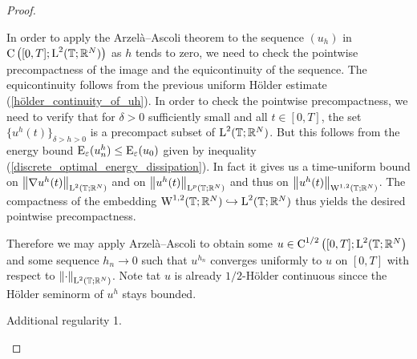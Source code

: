 \begin{proof}
\begin{description}[wide=0pt]
		In order to apply the Arzelà--Ascoli theorem to the sequence $ (u_{ h 
		} ) $ in $ \operatorname{C} \left( [ 0 , T ] ; \operatorname{L}^{ 2 } ( \operatorname{\mathbb{T}} ; \mathbb{ R 
		}^{ N } ) \right) $ as $ h $ tends to zero, we need to check the 
		pointwise precompactness of the image and the equicontinuity of the 
		sequence. 
		The equicontinuity follows from the previous uniform Hölder estimate 
		(\ref{hölder_continuity_of_uh}).
		In order to check the pointwise precompactness, we need to verify that 
		for $ \delta > 0 $ sufficiently small and all $ t \in [ 0 , T ] $, the 
		set
		$ \{ u^{ h } ( t ) \}_{ \delta > h > 0 } $ is a precompact subset of $ 
		\operatorname{L}^{ 2 } ( \operatorname{\mathbb{T}} ; \mathbb{ R }^{ N } ) $. 
		But this follows from the energy bound $ \operatorname{E}_{ \varepsilon } ( u_{ 
		n }^{ h } ) \leq \operatorname{E}_{ \varepsilon } ( u_{ 0 } ) $ given by 
		inequality (\ref{discrete_optimal_energy_dissipation}). In fact it 
		gives us a time-uniform bound on $ \norm{ \nabla u^{ h }( t ) }_{\operatorname{L}^{ 
		2 }( \operatorname{\mathbb{T}}; \mathbb{ R }^{ N } ) } $ and on $ \norm{ u^{ h } ( t 
		)}_{ \operatorname{L}^{ p } ( \operatorname{\mathbb{T}}; \mathbb{ R }^{ N } ) } $ and thus on $ 
		\norm{ u^{ h } ( t )}_{ \operatorname{W}^{ 1 , 2 } ( \operatorname{\mathbb{T}}; \mathbb{ R }^{ N } 
		) } $. 
		The compactness of the embedding
		$ \operatorname{W}^{ 1 , 2 } ( \operatorname{\mathbb{T}} ; \mathbb{ R }^{ N } ) \hookrightarrow \operatorname{L}^{ 2 } ( \operatorname{\mathbb{T}}; \mathbb{ R }^{ N } ) $ thus yields the desired pointwise precompactness.
		
		Therefore we may apply Arzelà--Ascoli to obtain some $ u \in \operatorname{C}^{ 1 
		/ 2 } \left( [ 0, T ] ; \operatorname{L}^{ 2 } ( \operatorname{\mathbb{T}} ; \mathbb{ R }^{ N } 
		\right) $ and some  sequence $ h_{ n } \to 0 $ such that
		$ u^{ h_{ n } } $ converges uniformly to $ u $ on $ [ 0 , T ] $ with 
		respect to $ \norm{ \cdot }_{ \operatorname{L}^{ 2 } ( \operatorname{\mathbb{T}} ; \mathbb{ R }^{ N 
		} ) } $.
		Note tat $ u $ is already $ 1/2 $-Hölder continuous sincce the Hölder 
		seminorm of $ u^{ h } $ stays bounded.
		
		\item[Step 6:] Additional regularity 1.
		

\end{description}
\end{proof}
